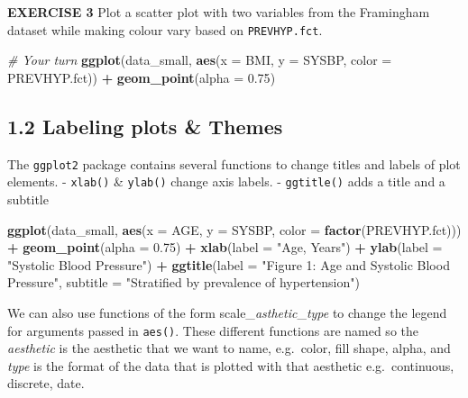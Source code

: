 \documentclass[
]{article}
\newenvironment{Shaded}{\begin{snugshade}}{\end{snugshade}}
\newcommand{\CommentTok}[1]{\textcolor[rgb]{0.56,0.35,0.01}{\textit{#1}}}
\newcommand{\DataTypeTok}[1]{\textcolor[rgb]{0.13,0.29,0.53}{#1}}
\newcommand{\FloatTok}[1]{\textcolor[rgb]{0.00,0.00,0.81}{#1}}
\newcommand{\KeywordTok}[1]{\textcolor[rgb]{0.13,0.29,0.53}{\textbf{#1}}}
\newcommand{\NormalTok}[1]{#1}
\newcommand{\OperatorTok}[1]{\textcolor[rgb]{0.81,0.36,0.00}{\textbf{#1}}}
\newcommand{\StringTok}[1]{\textcolor[rgb]{0.31,0.60,0.02}{#1}}
\begin{document}
\textbf{EXERCISE 3} Plot a scatter plot with two variables from the
Framingham dataset while making colour vary based on
\texttt{PREVHYP.fct}.

\begin{Shaded}
\begin{Highlighting}[]
\CommentTok{# Your turn}
\KeywordTok{ggplot}\NormalTok{(data_small, }
       \KeywordTok{aes}\NormalTok{(}\DataTypeTok{x =}\NormalTok{ BMI, }\DataTypeTok{y =}\NormalTok{ SYSBP, }\DataTypeTok{color =}\NormalTok{ PREVHYP.fct)) }\OperatorTok{+}
\StringTok{  }\KeywordTok{geom_point}\NormalTok{(}\DataTypeTok{alpha =} \FloatTok{0.75}\NormalTok{)}
\end{Highlighting}
\end{Shaded}

\hypertarget{labeling-plots-themes}{%
\subsection{1.2 Labeling plots \& Themes}\label{labeling-plots-themes}}

The \texttt{ggplot2} package contains several functions to change titles
and labels of plot elements. - \texttt{xlab()} \& \texttt{ylab()} change
axis labels. - \texttt{ggtitle()} adds a title and a subtitle

\begin{Shaded}
\begin{Highlighting}[]
\KeywordTok{ggplot}\NormalTok{(data_small, }
      \KeywordTok{aes}\NormalTok{(}\DataTypeTok{x =}\NormalTok{ AGE, }\DataTypeTok{y =}\NormalTok{ SYSBP, }\DataTypeTok{color =} \KeywordTok{factor}\NormalTok{(PREVHYP.fct))) }\OperatorTok{+}
\StringTok{  }\KeywordTok{geom_point}\NormalTok{(}\DataTypeTok{alpha =} \FloatTok{0.75}\NormalTok{) }\OperatorTok{+}
\StringTok{  }\KeywordTok{xlab}\NormalTok{(}\DataTypeTok{label =} \StringTok{"Age, Years"}\NormalTok{) }\OperatorTok{+}\StringTok{ }
\StringTok{  }\KeywordTok{ylab}\NormalTok{(}\DataTypeTok{label =} \StringTok{"Systolic Blood Pressure"}\NormalTok{) }\OperatorTok{+}
\StringTok{  }\KeywordTok{ggtitle}\NormalTok{(}\DataTypeTok{label =} \StringTok{"Figure 1: Age and Systolic Blood Pressure"}\NormalTok{, }
          \DataTypeTok{subtitle =} \StringTok{"Stratified by prevalence of hypertension"}\NormalTok{) }
\end{Highlighting}
\end{Shaded}

We can also use functions of the form
scale\_\emph{asthetic}\_\emph{type} to change the legend for arguments
passed in \texttt{aes()}. These different functions are named so the
\emph{aesthetic} is the aesthetic that we want to name, e.g.~color, fill
shape, alpha, and \emph{type} is the format of the data that is plotted
with that aesthetic e.g.~continuous, discrete, date.
\end{document}
